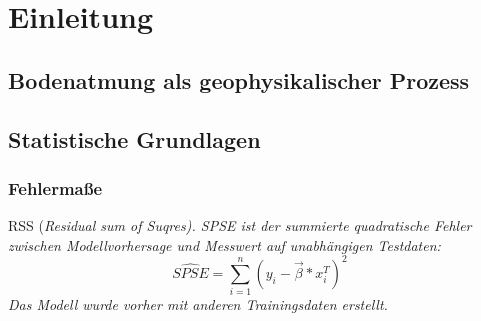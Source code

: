 \section{Einleitung}
\label{sec-intro}

\subsection{Bodenatmung als geophysikalischer Prozess}
\cite{foo}

\subsection{Statistische Grundlagen}

\subsubsection{Fehlermaße}
RSS (\it{Residual sum of Suqres}).
SPSE ist der summierte quadratische Fehler zwischen Modellvorhersage und Messwert auf unabhängigen Testdaten:
\begin{equation}
	\widehat{SPSE} = \sum_{i=1}^n (y_i - \vec{\beta} * x_i^T )^2
\end{equation}
Das Modell wurde vorher mit anderen Trainingsdaten erstellt.

